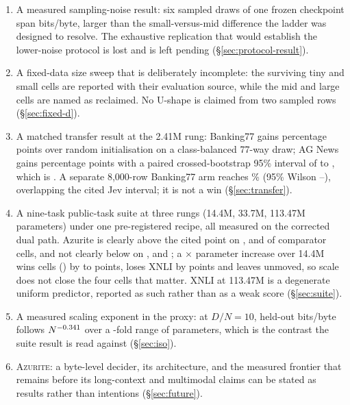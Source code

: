 \begin{enumerate}
  \item A measured sampling-noise result: six sampled draws of one frozen
  checkpoint span \ProtoOldSpread{} bits/byte, larger than the small-versus-mid
  difference the ladder was designed to resolve. The exhaustive replication that
  would establish the lower-noise protocol is lost and is left pending
  (\S\ref{sec:protocol-result}).
  \item A fixed-data size sweep that is deliberately incomplete: the surviving
  tiny and small cells are reported with their evaluation source, while the mid
  and large cells are named as reclaimed. No U-shape is claimed from two sampled
  rows (\S\ref{sec:fixed-d}).
  \item A matched transfer result at the 2.41M rung: Banking77 gains
  \TransferBankGain{} percentage points over random initialisation on a
  class-balanced 77-way draw; AG News gains \TransferAgGain{} percentage points
  with a paired crossed-bootstrap 95\% interval of \TransferAgLo{} to
  \TransferAgHi{}, which is \TransferAgVerdict. A separate 8,000-row Banking77 arm
  reaches \ShipAcc\% (95\% Wilson \ShipLo--\ShipHi), overlapping the cited Jev
  interval; it is not a win (\S\ref{sec:transfer}).
  \item A nine-task public-task suite at three rungs (14.4M, 33.7M, 113.47M
  parameters) under one pre-registered recipe, all measured on the corrected dual
  path. Azurite is clearly above the cited point on \SuiteSmallClear,
  \SuiteMidClear{} and \SuiteLargeClear{} of \SuiteComparatorCells{} comparator
  cells, and not clearly below on \SuiteSmallAtOrAboveThree,
  \SuiteMidAtOrAboveThree{} and \SuiteLargeAtOrAbove; a
  \SuiteLargeParamsRatio$\times$ parameter increase over 14.4M wins
  \SuiteLargeWins{} cells (\SuiteLargeWinCells) by \SuiteLargeWinMin{} to
  \SuiteLargeWinMax{} points, loses XNLI by \SuiteLargeLossAbs{} points and
  leaves \SuiteLargeUnmoved{} unmoved, so
  scale does not close the four cells that matter. XNLI at 113.47M is a
  degenerate uniform predictor, reported as such rather than as a weak score
  (\S\ref{sec:suite}).
  \item A measured scaling exponent in the proxy: at $D/N = 10$, held-out
  bits/byte follows $N^{-0.341}$ over a \IsoRange-fold range of parameters, which
  is the contrast the suite result is read against (\S\ref{sec:iso}).

  \item \textsc{Azurite}: a byte-level decider, its architecture, and the measured
  frontier that remains before its long-context and multimodal claims can be
  stated as results rather than intentions (\S\ref{sec:future}).
\end{enumerate}

